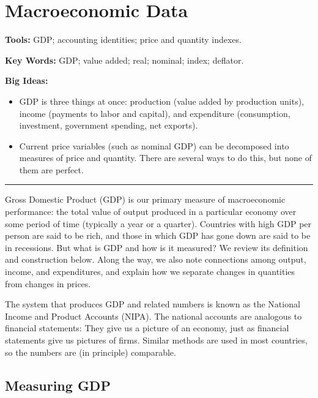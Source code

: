 \chapter{Macroeconomic Data}\label{chp:macd}
\hypertarget{data}{}

\textbf{Tools:} GDP; accounting identities; price and quantity indexes.

\textbf{Key Words:} GDP; value added; real; nominal; index; deflator.

\textbf{Big Ideas:}
\vspace{-0.1in}
\begin{itemize}
\item GDP is three things at once:  production (value added by production units),
income (payments to labor and capital),
and expenditure (consumption, investment, government spending, net exports).
\item Current price variables (such as nominal GDP) can be decomposed into measures of price and quantity.
There are several ways to do this, but none of them are perfect.
\end{itemize}
\rule{\textwidth}{1pt}

Gross Domestic Product (GDP) is our primary measure of
macroeconomic performance:  the total value of output produced in
a particular economy over some period of time (typically a year or
a quarter). Countries with high GDP per person are said to be
rich, and those in which GDP has gone down are said to be in
recessions. But what is GDP and how is it measured?
We review its definition and construction below.
Along the way, we also
note connections among output, income, and expenditures,
and explain how we separate changes in quantities
from changes in prices.

The system that produces GDP and related numbers
is known as the National Income and Product Accounts
(NIPA).
The national accounts are analogous to financial statements:
They give us a picture of an economy,
just as financial statements give us pictures of firms.
Similar methods are used in most countries, so the numbers
are (in principle) comparable.


\section{Measuring GDP}

